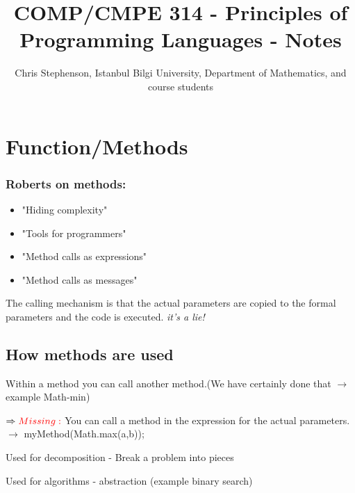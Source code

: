 \documentclass{article}
\begin{document}
\title{COMP/CMPE 314 - Principles of Programming Languages - Notes}
\author{Chris Stephenson, Istanbul Bilgi University, Department of Mathematics, and course students}
\maketitle


\section*{Function/Methods}
\subsubsection*{Roberts on methods:}
  \begin{itemize}
        \item "Hiding complexity"
		\item "Tools for programmers"
		\item "Method calls as expressions"
		\item "Method calls as messages"
   \end{itemize}
 
\begin{flushleft}
The calling mechanism is that the actual parameters are copied to the formal parameters and the code is executed.
\emph{\color{red} it's a lie!}\\

\end{flushleft}
\subsection*{How methods are used}
Within a method you can call another method.(We have certainly done that $\rightarrow$ example Math-min)

\begin{flushleft}
$\Rightarrow {\color{red}Missing:}$
You can call a method in the expression for the actual parameters. $\rightarrow$ myMethod(Math.max(a,b));
\end{flushleft}
\begin{flushleft}
 Used for decomposition - Break a problem into pieces
 \end{flushleft} 
\begin{flushleft}
Used for algorithms - abstraction (example binary search)
\end{flushleft}


\newcommand*{\Comb}[2]{{}^{#1}C_{#2}}%
\end{document}
